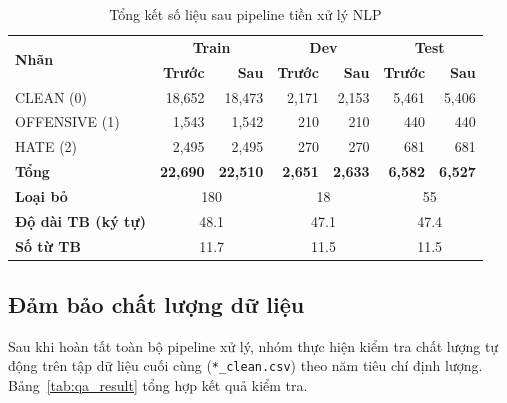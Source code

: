 \begin{table}[H]
    \centering
    \caption{Tổng kết số liệu sau pipeline tiền xử lý NLP}
    \label{tab:nlp_result}
    \begin{tabular}{lrrrrrr}
        \hline
        \multirow{2}{*}{\textbf{Nhãn}}     &
        \multicolumn{2}{c}{\textbf{Train}} &
        \multicolumn{2}{c}{\textbf{Dev}}   &
        \multicolumn{2}{c}{\textbf{Test}}                                                                                                                                      \\
                                           & \textbf{Trước}           & \textbf{Sau}             & \textbf{Trước}           & \textbf{Sau}   & \textbf{Trước} & \textbf{Sau}   \\
        \hline
        CLEAN (0)                          & 18,652                   & 18,473                   & 2,171                    & 2,153          & 5,461          & 5,406          \\
        OFFENSIVE (1)                      & 1,543                    & 1,542                    & 210                      & 210            & 440            & 440            \\
        HATE (2)                           & 2,495                    & 2,495                    & 270                      & 270            & 681            & 681            \\
        \hline
        \textbf{Tổng}                      & \textbf{22,690}          & \textbf{22,510}          & \textbf{2,651}           & \textbf{2,633} & \textbf{6,582} & \textbf{6,527} \\
        \textbf{Loại bỏ}                   & \multicolumn{2}{c}{180}  & \multicolumn{2}{c}{18}   & \multicolumn{2}{c}{55}                                                      \\
        \hline
        \textbf{Độ dài TB (ký tự)}         & \multicolumn{2}{c}{48.1} & \multicolumn{2}{c}{47.1} & \multicolumn{2}{c}{47.4}                                                    \\
        \textbf{Số từ TB}                  & \multicolumn{2}{c}{11.7} & \multicolumn{2}{c}{11.5} & \multicolumn{2}{c}{11.5}                                                    \\
        \hline
    \end{tabular}
\end{table}

\subsection{Đảm bảo chất lượng dữ liệu}
Sau khi hoàn tất toàn bộ pipeline xử lý, nhóm thực hiện kiểm tra chất lượng tự động trên tập dữ liệu cuối cùng (\texttt{*\_clean.csv}) theo năm tiêu chí định lượng. Bảng~\ref{tab:qa_result} tổng hợp kết quả kiểm tra.

